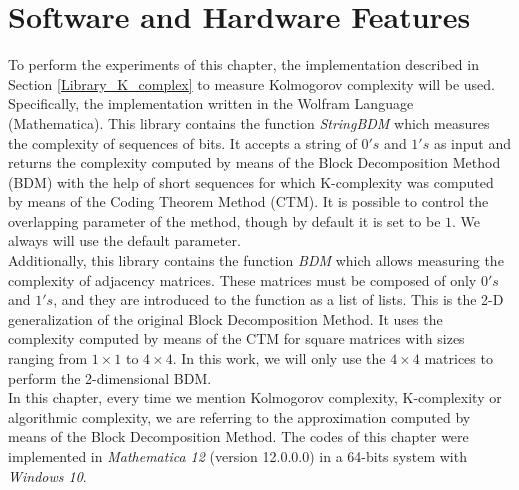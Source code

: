 \section{Software and Hardware Features}
To perform the experiments of this chapter, the implementation described in Section \ref{Library_K_complex} to measure Kolmogorov complexity will be used. Specifically, the implementation written in the Wolfram Language (Mathematica). This library contains the function \textit{StringBDM} which measures the complexity of sequences of bits. It accepts a string of $0's$ and $1's$ as input and returns the complexity computed by means of the Block Decomposition Method (BDM) with the help of short sequences for which K-complexity was computed by means of the Coding Theorem Method (CTM). It is possible to control the overlapping parameter of the method, though by default it is set to be $1$. We always will use the default parameter.\\

Additionally, this library contains the function \textit{BDM} which allows measuring the complexity of adjacency matrices. These matrices must be composed of only $0's$ and $1's$, and they are introduced to the function as a list of lists. This is the 2-D generalization of the original Block Decomposition Method. It uses the complexity computed by means of the CTM for square matrices with sizes ranging from $1 \times 1$ to $4 \times 4$. In this work, we will only use the $4 \times 4$ matrices to perform the 2-dimensional BDM.\\

In this chapter, every time we mention Kolmogorov complexity, K-complexity or algorithmic complexity, we are referring to the approximation computed by means of the Block Decomposition Method. The codes of this chapter were implemented in \textit{Mathematica 12} (version 12.0.0.0) in a 64-bits system with \textit{Windows 10}. 

